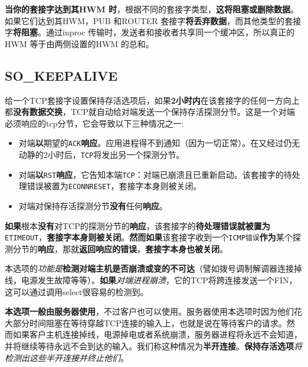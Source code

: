 \documentclass[UTF8,a4paper,12pt]{ctexbook}
\begin{document}
			\textbf{当你的套接字达到其HWM 时}，根据不同的套接字类型，\textbf{这将阻塞或删除数据}。如果它们达到其HWM，PUB 和ROUTER 套接字\textbf{将丢弃数据}，而其他类型的套接字\textbf{将阻塞}。通过inproc 传输时，发送者和接收者共享同一个缓冲区，所以真正的HWM 等于由两侧设置的HWM 的总和。
			
		\subsection{SO\_KEEPALIVE}			
		给一个TCP套接字设置保持存活选项后，如果\textbf{2小时内}在该套接字的任何一方向上都\textbf{没有数据交换}，TCP就自动给对端发送一个保持存活探测分节。这是一个对端必须响应的tcp分节，它会导致以下三种情况之一:
			\begin{itemize}
				\item 对端\textbf{以}期望的\verb|ACK|\textbf{响应}。应用进程得不到通知（因为一切正常）。在又经过仍无动静的2小时后，\verb|TCP|将发出另一个探测分节。
				\item 对端\textbf{以}\verb|RST|\textbf{响应}，它告知本端\verb|TCP|：对端已崩溃且已重新启动。该套接字的待处理错误被置为\verb|ECONNRESET|，套接字本身则被关闭。
				\item 对端对保持存活探测分节\textbf{没有}任何\textbf{响应}。
			\end{itemize}
			
			\textbf{如果}根本\textbf{没有}对TCP的探测分节的\textbf{响应}，该套接字的\textbf{待处理错误就被置为}\verb|ETIMEOUT|，\textbf{套接字本身则被关闭}。\textbf{然而如果}该套接字收到一个\verb|ICMP错误|\textbf{作为}某个探测分节的\textbf{响应}，那就\textbf{返回响应的错误}，\textbf{套接字本身也被关闭}。
			
			本选项的\textit{功能是}\textbf{检测对端主机是否崩溃或变的不可达}（譬如拨号调制解调器连接掉线，电源发生故障等等）。\textbf{如果}\textit{对端进程崩溃}，它的TCP将跨连接发送一个FIN，这可以通过调用select很容易的检测到。
			
			\textbf{本选项一般由服务器使用}，不过客户也可以使用。服务器使用本选项时因为他们花大部分时间阻塞在等待穿越TCP连接的输入上，也就是说在等待客户的请求。然而如果客户主机连接掉线，电源掉电或者系统崩溃，服务器进程将永远不会知道，并将继续等待永远不会到达的输入。我们称这种情况为\textbf{半开连接}。\textbf{保持存活选项}\textit{将检测出这些半开连接并终止他们}。
			
\end{document}
